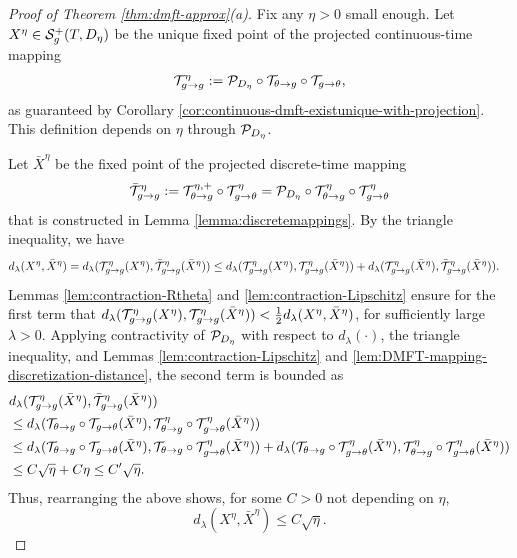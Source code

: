 \begin{proof}[Proof of Theorem \ref{thm:dmft-approx}(a)]
Fix any $\eta>0$ small enough.
Let $X^\eta \in \mathcal{S}_g^+(T,D_\eta)$ be the unique fixed
point of the projected continuous-time mapping
\[\mathcal{T}_{g \to g}^\eta:=\mathcal{P}_{D_\eta} \circ
\mathcal{T}_{\theta \to g} \circ \mathcal{T}_{g \to \theta},\]
as guaranteed by Corollary
\ref{cor:continuous-dmft-existunique-with-projection}.
This definition depends on $\eta$
through $\mathcal{P}_{D_\eta}$.

Let $\bar X^\eta$ be the fixed point of the projected
discrete-time mapping
\[\bar {\mathcal{T}}_{g \to g}^\eta:=
\mathcal{T}_{\theta \to g}^{\eta,+} \circ \mathcal{T}_{g \to \theta}^\eta
=\mathcal{P}_{D_\eta} \circ \mathcal{T}_{\theta \to g}^\eta \circ
\mathcal{T}_{g \to \theta}^\eta\]
that is constructed in Lemma \ref{lemma:discretemappings}.
By the triangle inequality, we have
\begin{align*}
    d_{\lambda}(X^\eta, \bar X^\eta) &= d_{\lambda}(\mathcal{T}_{g\to g}^\eta(X^\eta),
\bar{\mathcal{T}}_{g\to g}^\eta(\bar X^\eta)) \leq d_{\lambda}(\mathcal{T}_{g\to g}^\eta(X^\eta),
\mathcal{T}_{g\to g}^\eta(\bar X^\eta)) + d_{\lambda}(\mathcal{T}_{g\to g}^\eta(\bar X^\eta),
\bar{\mathcal{T}}^{\eta}_{g\to g}(\bar X^\eta)).
  \end{align*}
Lemmas
\ref{lem:contraction-Rtheta} and
\ref{lem:contraction-Lipschitz}
ensure for the first term that
$d_{\lambda}(\mathcal{T}_{g\to g}^\eta(X^\eta),\mathcal{T}_{g\to g}^\eta(\bar X^\eta))
<\frac{1}{2}d_\lambda(X^\eta,\bar X^\eta)$, for sufficiently large $\lambda>0$.
Applying contractivity of $\mathcal{P}_{D_\eta}$ with respect to $d_\lambda(\cdot)$,
the triangle inequality, and Lemmas
\ref{lem:contraction-Lipschitz} and
\ref{lem:DMFT-mapping-discretization-distance}, the second term is bounded as
\begin{align}
&d_{\lambda}(\mathcal{T}^{\eta}_{g\to g}(\bar X^\eta),\bar {\mathcal{T}}_{g\to g}^\eta(\bar
X^\eta))\notag\\
&\leq d_{\lambda}(\mathcal{T}_{\theta \to g} \circ \mathcal{T}_{g \to \theta}(\bar X^\eta),
\mathcal{T}_{\theta \to g}^\eta \circ \mathcal{T}_{g \to \theta}^\eta(\bar X^\eta))\notag\\
&\leq d_{\lambda}(\mathcal{T}_{\theta \to g} \circ \mathcal{T}_{g \to \theta}(\bar X^\eta),
\mathcal{T}_{\theta \to g} \circ \mathcal{T}_{g \to \theta}^\eta(\bar X^\eta))
+d_{\lambda}(\mathcal{T}_{\theta \to g} \circ \mathcal{T}_{g \to \theta}^\eta(\bar X^\eta),
\mathcal{T}_{\theta \to g}^\eta \circ \mathcal{T}_{g \to \theta}^\eta(\bar X^\eta))\notag\\
&\leq C\sqrt{\eta}+C\eta \leq C'\sqrt{\eta}.\label{eq:TTetabound}
\end{align}
Thus, rearranging the above shows, for some $C>0$ not depending on $\eta$,
\begin{equation}\label{eq:XXetabound}
d_{\lambda}(X^\eta, \bar X^\eta) \leq C\sqrt{\eta}.
\end{equation}


\end{proof}

